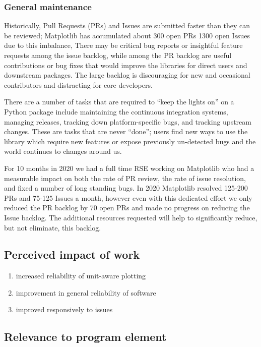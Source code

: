 \documentclass[12pt]{article}
\numberwithin{page}{section}
\begin{document}
\subsubsection{General maintenance}


Historically, Pull Requests (PRs) and Issues are submitted faster than
they can be reviewed; Matplotlib has accumulated about 300 open PRs
1300 open Issues due to this imbalance, There may be critical bug
reports or insightful feature requests among the issue backlog, while
among the PR backlog are useful contributions or bug fixes that would
improve the libraries for direct users and downstream packages.  The
large backlog is discouraging for new and occasional contributors and
distracting for core developers.

There are a number of tasks that are required to ``keep the lights
on'' on a Python package include maintaining the continuous
integration systems, managing releases, tracking down
platform-specific bugs, and tracking upstream changes.  These are
tasks that are never ``done''; users find new ways to use the library
which require new features or expose previously un-detected bugs and
the world continues to changes around us.

For 10 months in 2020 we had a full time RSE working on Matplotlib who
had a measurable impact on both the rate of PR review, the rate of
issue resolution, and fixed a number of long standing bugs.  In 2020
Matplotlib resolved 125-200 PRs and 75-125 Issues a month, however
even with this dedicated effort we only reduced the PR backlog by 70
open PRs and made no progress on reducing the Issue backlog.  The
additional resources requested will help to significantly reduce, but
not eliminate, this backlog.

\subsection{Perceived impact of work}
\begin{enumerate}
\item increased reliability of unit-aware plotting
\item improvement in general reliability of software
\item improved responsively to issues
\end{enumerate}
\subsection{Relevance to program element}
\end{document}
